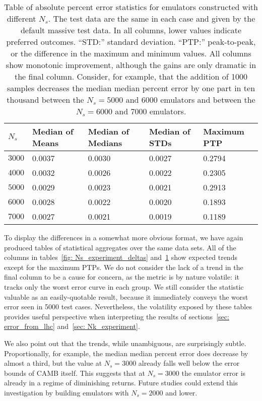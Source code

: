 \begin{table}[ht!]
\centering
\begin{tabular}{l|l|l|l|l}
\hline
$N_s$ & Median of Means & Median of Medians & Median of STDs & Maximum PTP \\ \hline
$3000$ & 0.0037 & 0.0030 & 0.0027 & 0.2794 \\
$4000$ & 0.0032 & 0.0026 & 0.0022 & 0.2305 \\
$5000$ & 0.0029 & 0.0023 & 0.0021 & 0.2913 \\
$6000$ & 0.0028 & 0.0022 & 0.0020 & 0.1893 \\
$7000$ & 0.0027 & 0.0021 & 0.0019 & 0.1189 \\
\end{tabular}
	\cprotect\caption[$N_s$ Experiment: Percent Error Statistics]{Table of
		absolute percent error statistics
		for emulators constructed with different $N_s$.
		The test data are the same in each case and given by the default
		massive test data.
		In all columns,
		lower values indicate preferred outcomes. ``STD:'' standard
		deviation. ``PTP:'' peak-to-peak, or the difference in the maximum
		and minimum values.
		All columns show monotonic improvement, although the gains are only
		dramatic in the final column. Consider, for example, that the
		addition of 1000 samples decreases the median median percent error
		by one part in ten thousand between the $N_s = 5000$ and 6000
		emulators and between the $N_s = 6000$ and 7000 emulators.}
 \label{tab: Ns_experiment_percerr_stats}
\end{table}

To display the differences in a somewhat more obvious format, we have again
produced tables of statistical aggregates over the same data sets. All of
the columns in tables~\ref{fig: Ns_experiment_deltas}
and~\ref{tab: Ns_experiment_percerr_stats} show expected trends except for
the maximum PTPs. We do not consider the lack of a trend in the final column
to be a cause for concern, as the metric is by nature volatile: it tracks only
the worst error curve in each group. We still consider the statistic
valuable as an easily-quotable result, because it immediately conveys the
worst error seen in 5000 test cases. Nevertheless, the volatility exposed by 
these tables provides useful perspective when interpreting the results of
sections~\ref{sec: error_from_lhc} and~\ref{sec: Nk_experiment}.

We also point out that the trends, while unambiguous, are surprisingly
subtle. Proportionally, for example, the median median percent error does
decrease by almost a third, but the value at $N_s=3000$ already falls well 
below the error bounds of CAMB itself. This suggests that at $N_s = 3000$
the emulator error is already in a regime of
diminishing returns. Future studies could extend this
investigation by building emulators with $N_s = 2000$ and lower.


